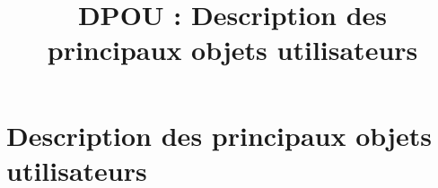 

\title{DPOU : Description des principaux objets utilisateurs}


\setcounter{tocdepth}{1}
\maketitle
\tableofcontents
\newpage

\part{Description des principaux objets utilisateurs}

\newpage


